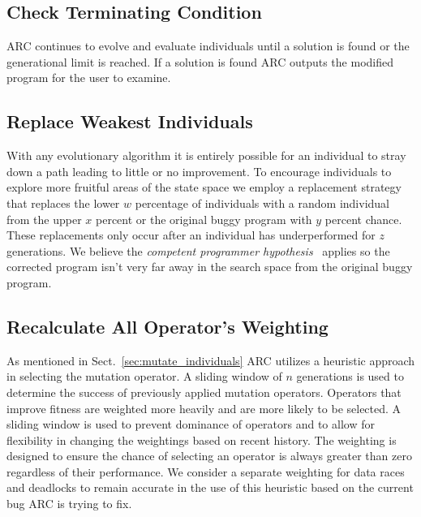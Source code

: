 \subsection{Check Terminating Condition}
\label{sec:check_terminating_condition}

ARC continues to evolve and evaluate individuals until
a solution is found or the
generational limit is reached. If a solution is found ARC outputs the modified program for the user to examine.

\subsection{Replace Weakest Individuals}
\label{sec:replace_weakest_individuals}

With any evolutionary algorithm it is entirely possible for an individual to
stray down a path leading to little or no improvement. To encourage individuals
to explore more fruitful areas of the state space we employ a replacement
strategy that replaces the lower $w$ percentage of individuals with a random
individual from the upper $x$ percent or the original buggy program with $y$
percent chance. These replacements only occur after an individual has
underperformed for $z$ generations. We believe the \textit{competent programmer
hypothesis}~\cite{ABD+79} applies so the corrected program isn't very far away
in the search space from the original buggy program.

\subsection{Recalculate All Operator's Weighting}
\label{sec:recalculate_operator_weighting}

As mentioned in Sect.~\ref{sec:mutate_individuals} ARC utilizes a heuristic
approach in selecting the mutation operator. A sliding window of $n$
generations is used to determine the success of previously applied mutation
operators. Operators that improve fitness are weighted more heavily and are
more likely to be selected. A sliding window is used to prevent dominance of
operators and to allow for flexibility in changing the weightings based on
recent history. The weighting is designed to ensure the chance of selecting an
operator is always greater than zero regardless of their performance.
We consider a separate weighting for data races and deadlocks to remain
accurate in the use of this heuristic based on the current bug ARC is trying to
fix.
